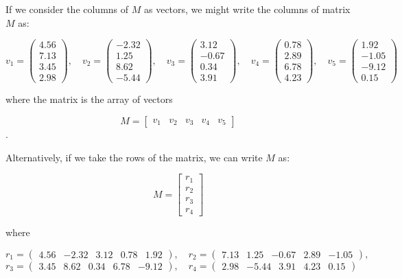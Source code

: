 \documentclass{ximera}
\begin{document}
\begin{example}

    If we consider the columns of $M$ as vectors, we might write the columns of matrix $M$ as: 

    \[
v_1 = \begin{pmatrix} 4.56 \\ 7.13 \\ 3.45 \\ 2.98 \end{pmatrix}, \quad
v_2 = \begin{pmatrix} -2.32 \\ 1.25 \\ 8.62 \\ -5.44 \end{pmatrix}, \quad
v_3 = \begin{pmatrix} 3.12 \\ -0.67 \\ 0.34 \\ 3.91 \end{pmatrix}, \quad
v_4 = \begin{pmatrix} 0.78 \\ 2.89 \\ 6.78 \\ 4.23 \end{pmatrix}, \quad
v_5 = \begin{pmatrix} 1.92 \\ -1.05 \\ -9.12 \\ 0.15 \end{pmatrix}
\]

where the matrix is the array of vectors

    \[
M =
\left[\begin{array}{ccccc}
  v_1 & v_2 & v_3 & v_4 & v_5
\end{array}
\right]
\].

Alternatively, if we take the rows of the matrix, we can write $M$ as:

\[
M =
\left[\begin{array}{c}
  r_1 \\
  r_2 \\
  r_3 \\
  r_4
\end{array}
\right]
\]

where

\[
r_1 = \begin{pmatrix} 4.56 & -2.32 & 3.12 & 0.78 & 1.92 \end{pmatrix}, \quad
r_2 = \begin{pmatrix} 7.13 & 1.25 & -0.67 & 2.89 & -1.05 \end{pmatrix}, \quad \]
\[
r_3 = \begin{pmatrix} 3.45 & 8.62 & 0.34 & 6.78 & -9.12 \end{pmatrix}, \quad
r_4 = \begin{pmatrix} 2.98 & -5.44 & 3.91 & 4.23 & 0.15 \end{pmatrix}
\]\


\end{example}
\end{document}
